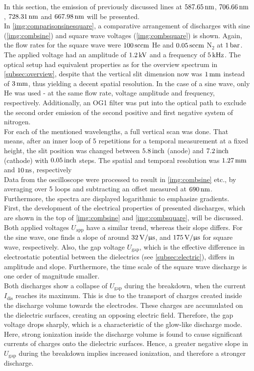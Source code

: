 \documentclass[a4paper,10pt,twoside]{article}
\newcommand{\ix}[1]{_\text{#1}}
\begin{document}
			In this section, the emission of previously discussed lines at $\unit[587.65]{nm}$, $\unit[706.66]{nm}$, $\unit[728.31]{nm}$ and $\unit[667.98]{nm}$ will be presented.\\
			In \autoref{img:comparisonsinesquare}, a comparative arrangement of discharges with sine (\autoref{img:combsine}) and square wave voltages (\autoref{img:combsquare}) is shown. Again, the flow rates for the square wave were $\unit[100]{sccm}$ He and $\unit[0.05]{sccm}$ N$_2$ at $\unit[1]{bar}$. The applied voltage had an amplitude of $\unit[1.2]{kV}$ and a frequency of $\unit[5]{kHz}$. The optical setup had equivalent properties as for the overview spectrum in \autoref{subsec:overview}, despite that the vertical slit dimension now was $\unit[1]{mm}$ instead of $\unit[3]{mm}$, thus yielding a decent spatial resolution. In the case of a sine wave, only He was used - at the same flow rate, voltage amplitude and frequency, respectively. Additionally, an OG1 filter was put into the optical path to exclude the second order emission of the second positive and first negative system of nitrogen.\\
			For each of the mentioned wavelengths, a full vertical scan was done. That means, after an inner loop of 5 repetitions for a temporal measurement at a fixed height, the slit position was changed between $\unit[5.8]{inch}$ (anode) and $\unit[7.2]{inch}$ (cathode) with $\unit[0.05]{inch}$ steps. The spatial and temporal resolution was $\unit[1.27]{mm}$ and $\unit[10]{ns}$, respectively\\
			Data from the oscilloscope were processed to result in \autoref{img:combsine} etc., by averaging over 5 loops and subtracting an offset measured at $\unit[690]{nm}$. Furthermore, the spectra are displayed logarithmic to emphasize gradients.\\
			First, the development of the electrical properties of presented discharges, which are shown in the top of \autoref{img:combsine} and \autoref{img:combsquare}, will be discussed. Both applied voltages $U\ix{app}$ have a similar trend, whereas their slope differs. For the sine wave, one finds a slope of around $\unit[32]{V/\upmu s}$, and $\unit[175]{V/\upmu s}$ for square wave, respectively. Also, the gap voltage $U\ix{gap}$, which is the effective difference in electrostatic potential between the dielectrics (see \autoref{subsec:electric}), differs in amplitude and slope. Furthermore, the time scale of the square wave discharge is one order of magnitude smaller.\\
			Both discharges show a collapse of $U\ix{gap}$ during the breakdown, when the current $I\ix{dis}$ reaches its maximum. This is due to the transport of charges created inside the discharge volume towards the electrodes. These charges are accumulated on the dielectric surfaces, creating an opposing electric field. Therefore, the gap voltage drops sharply, which is a characteristic of the glow-like discharge mode. Here, strong ionization inside the discharge volume is found to cause significant currents of charges onto the dielectric surfaces. Hence, a greater negative slope in $U\ix{gap}$ during the breakdown implies increased ionization, and therefore a stronger discharge. \\
\end{document}
